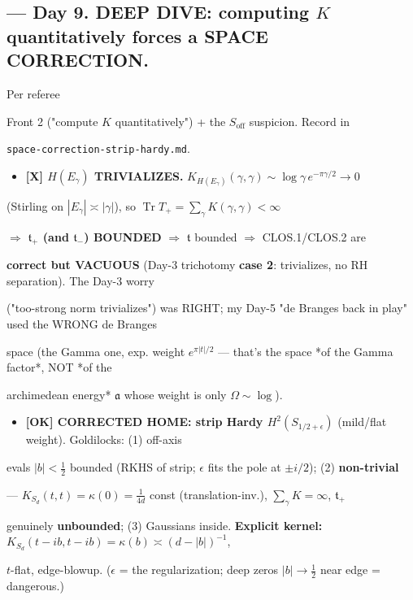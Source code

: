 \documentclass[10pt]{article}
\begin{document}
\subsection*{ --- Day 9. DEEP DIVE: computing $K$ quantitatively forces a SPACE CORRECTION.}
Per referee\par
Front 2 ("compute $K$ quantitatively") + the $S_{\mathrm{off}}$ suspicion. Record in\par
\texttt{space-correction-strip-hardy.md}.\par
\begin{itemize}
\item \textbf{[X] $H(E_\gamma)$ TRIVIALIZES.} $K_{H(E_\gamma)}(\gamma,\gamma)\sim\log\gamma\,e^{-\pi\gamma/2}\to0$
\end{itemize}
  (Stirling on $|E_\gamma|\asymp|\gamma|$), so $\operatorname{Tr}T_+=\sum_\gamma K(\gamma,\gamma)<\infty$\par
  \ensuremath{\Rightarrow} \textbf{$\mathfrak t_+$ (and $\mathfrak t_-$) BOUNDED} \ensuremath{\Rightarrow} $\mathfrak t$ bounded \ensuremath{\Rightarrow} CLOS.1/CLOS.2 are\par
  \textbf{correct but VACUOUS} (Day-3 trichotomy \textbf{case 2}: trivializes, no RH separation). The Day-3 worry\par
  ("too-strong norm trivializes") was RIGHT; my Day-5 "de Branges back in play" used the WRONG de Branges\par
  space (the Gamma one, exp. weight $e^{\pi|t|/2}$ --- that's the space *of the Gamma factor*, NOT *of the\par
  archimedean energy* $\mathfrak a$ whose weight is only $\Omega\sim\log$).\par
\begin{itemize}
\item \textbf{[OK] CORRECTED HOME: strip Hardy $H^2(S_{1/2+\epsilon})$} (mild/flat weight). Goldilocks: (1) off-axis
\end{itemize}
  evals $|b|<\tfrac12$ bounded (RKHS of strip; $\epsilon$ fits the pole at $\pm i/2$); (2) \textbf{non-trivial}\par
  --- $K_{S_d}(t,t)=\kappa(0)=\tfrac1{4d}$ const (translation-inv.), $\sum_\gamma K=\infty$, $\mathfrak t_+$\par
  genuinely \textbf{unbounded}; (3) Gaussians inside. \textbf{Explicit kernel:} $K_{S_d}(t-ib,t-ib)=\kappa(b)\asymp(d-|b|)^{-1}$,\par
  $t$-flat, edge-blowup. ($\epsilon$ = the regularization; deep zeros $|b|\to\tfrac12$ near edge = dangerous.)\par
\end{document}
